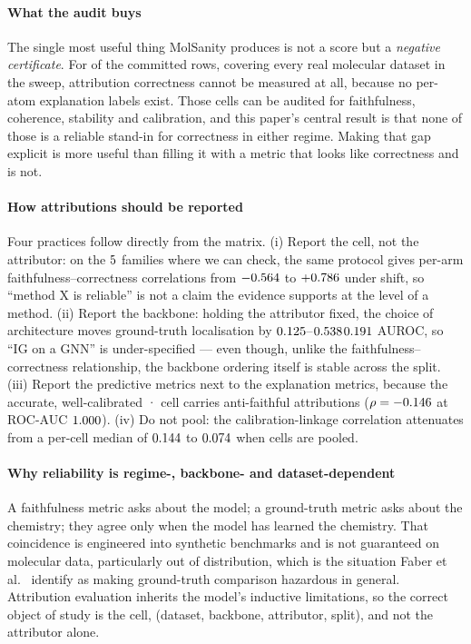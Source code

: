 \paragraph{What the audit buys} The single most useful thing MolSanity produces
is not a score but a \emph{negative certificate}. For \nNoGtCells{} of the
\nRowsTotal{} committed rows, covering every real molecular dataset in the
sweep, attribution correctness cannot be measured at all, because no per-atom
explanation labels exist. Those cells can be audited for faithfulness,
coherence, stability and calibration, and this paper's central result is that
none of those is a reliable stand-in for correctness in either regime. Making that
gap explicit is more useful than filling it with a metric that looks like
correctness and is not.

\paragraph{How attributions should be reported} Four practices follow directly
from the matrix. (i) Report the cell, not the attributor: on the $5{}$
families where we can check, the same protocol gives per-arm
faithfulness--correctness correlations from $-0.564{}$ to
$+0.786{}$ under shift, so ``method X is reliable'' is not a claim
the evidence supports at the level of a method. (ii) Report the backbone:
holding the attributor fixed, the choice of architecture moves ground-truth
localisation by
\ifHasBackboneArms$0.125{}$--$0.538{}$\else$0.191{}$\fi{}
AUROC, so ``IG on a GNN'' is under-specified --- even though, unlike the
faithfulness--correctness relationship, the backbone ordering itself is stable
across the split. (iii) Report the predictive metrics next to the explanation
metrics, because the accurate, well-calibrated
\bestAucDataset{}·\bestAucBackbone{} cell carries anti-faithful attributions
($\rho=-0.146{}$ at ROC-AUC $1.000{}$). (iv) Do not pool: the
calibration-linkage correlation attenuates from a per-cell median of
$0.144{}$ to $0.074{}$ when cells are pooled.

\paragraph{Why reliability is regime-, backbone- and dataset-dependent} A
faithfulness metric asks about the model; a ground-truth metric asks about the
chemistry; they agree only when the model has learned the chemistry. That
coincidence is engineered into synthetic benchmarks and is not guaranteed on
molecular data, particularly out of distribution, which is the situation Faber
et al.~\cite{faber} identify as making ground-truth comparison hazardous in
general. Attribution evaluation inherits the model's inductive limitations, so
the correct object of study is the cell, (dataset, backbone, attributor,
split), and not the attributor alone.

